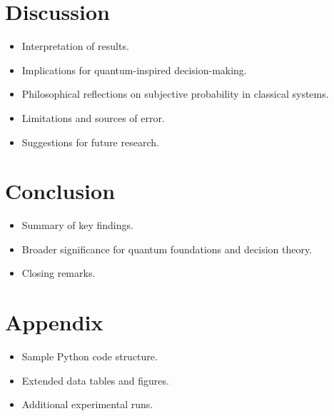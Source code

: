 \documentclass[12pt]{article}
\begin{document}
\section{Discussion}
\begin{itemize}
    \item Interpretation of results.
    \item Implications for quantum-inspired decision-making.
    \item Philosophical reflections on subjective probability in classical systems.
    \item Limitations and sources of error.
    \item Suggestions for future research.
\end{itemize}

\section{Conclusion}
\begin{itemize}
    \item Summary of key findings.
    \item Broader significance for quantum foundations and decision theory.
    \item Closing remarks.
\end{itemize}

\appendix

\section{Appendix}
\begin{itemize}
    \item Sample Python code structure.
    \item Extended data tables and figures.
    \item Additional experimental runs.
\end{itemize}



\end{document}
